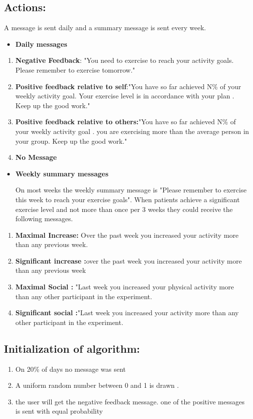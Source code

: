 \documentclass[11pt]{article}
\begin{document}
\subsection{Actions:}
A message is sent daily and a summary message is sent every week.
\begin{itemize}
\item  \textbf{Daily messages}
\end{itemize}
\begin{enumerate}
\item  \textbf{Negative Feedback}: "You need to exercise to reach your activity goals. Please remember to exercise tomorrow."
\item  \textbf{Positive feedback relative to self}:"You have so far achieved N\% of your weekly activity goal. Your exercise level is in accordance with your plan . Keep up the good work."
\item  \textbf{Positive feedback relative to others:}"You have so far achieved N\% of your weekly activity goal . you are exercising more than the average person in your group. Keep up the good work."
\item  \textbf{No Message}
\end{enumerate}
\begin{itemize}
\item  \textbf{Weekly summary messages}

On most weeks the weekly summary message is "Please remember to exercise this week to reach your exercise goals". When patients achieve a significant exercise level and not more than once per 3 weeks they could receive the following messages.
\end{itemize}
\begin{enumerate}
\item  \textbf{Maximal Increase:} Over the past week you increased your activity more than any previous week.
\item  \textbf{Significant increase :}over the past week you increased your activity more than any previous week
\item  \textbf{Maximal Social :} "Last week you increased your physical activity more than any other participant in the experiment.
\item  \textbf{Significant social :}"Last week you increased your activity more than any other participant in the experiment.
\end{enumerate}
\subsection{Initialization of algorithm:}
\begin{enumerate}
\item  On 20\% of days no message was sent 
\item  A uniform random number between 0 and 1 is drawn .
\item  
\begin{algorithmic}
 \STATE the user will get the negative feedback message.
\ELSE
\STATE one of the positive messages is sent with equal probability
\ENDIF
\end{algorithmic}
\end{enumerate}
\end{document}

